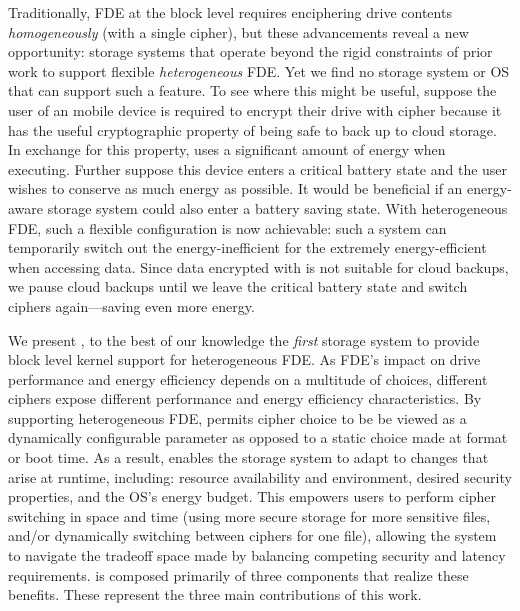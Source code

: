 Traditionally, FDE at the block level requires enciphering drive contents {\em
homogeneously} (with a single cipher), but these advancements reveal a new
opportunity: storage systems that operate beyond the rigid constraints of prior
work to support flexible {\em heterogeneous} FDE. Yet we find no storage system
or OS that can support such a feature. To see where this might be useful,
suppose the user of an mobile device is required to encrypt their drive with
cipher \encA because it has the useful cryptographic property of being safe to
back up to cloud storage. In exchange for this property, \encA uses a
significant amount of energy when executing. Further suppose this device enters
a critical battery state and the user wishes to conserve as much energy as
possible. It would be beneficial if an energy-aware storage system could also
enter a battery saving state. With heterogeneous FDE, such a flexible
configuration is now achievable: such a system can temporarily switch out the
energy-inefficient \encA for the extremely energy-efficient \encB when accessing
data. Since data encrypted with \encB is not suitable for cloud backups, we
pause cloud backups until we leave the critical battery state and switch ciphers
again---saving even more energy.


We present \sys, to the best of our knowledge the {\em first} storage system to
provide block level kernel support for heterogeneous FDE. As FDE's impact on
drive performance and energy efficiency depends on a multitude of choices,
different ciphers expose different performance and energy efficiency
characteristics. By supporting heterogeneous FDE, \sys permits cipher choice to
be be viewed as a dynamically configurable parameter as opposed to a static
choice made at format or boot time. As a result, \sys enables the storage system
to adapt to changes that arise at runtime, including: resource availability and
environment, desired security properties, and the OS's energy budget. This
empowers users to perform cipher switching in space and time (\eg using more
secure storage for more sensitive files, and/or dynamically switching between
ciphers for one file), allowing the system to navigate the tradeoff space made
by balancing competing security and latency requirements.  \sys is composed
primarily of three components that realize these benefits. These represent the
three main contributions of this work.

